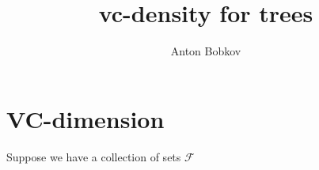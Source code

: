 \documentclass{amsart}
\begin{document}
\title{vc-density for trees}
\author{Anton Bobkov}

\maketitle

\section{VC-dimension}

Suppose we have a collection of sets $\mathcal{F}$
\end{document}
